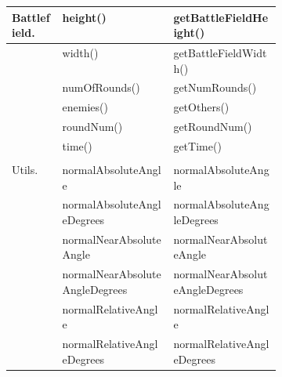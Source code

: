 \begin{center}
    \begin{tabular}{ | l| l | p{0.4\linewidth} | }
    \hline
    Battlefield. & height() & getBattleFieldHeight() \\ \hline
     & width() & getBattleFieldWidth() \\ \hline
     & numOfRounds() & getNumRounds() \\ \hline
     & enemies() & getOthers() \\ \hline
     & roundNum() & getRoundNum() \\ \hline
     & time() & getTime()  \\ \hline
   	 & &  \\ \hline    
     Utils. & normalAbsoluteAngle & normalAbsoluteAngle \\ \hline
     & normalAbsoluteAngleDegrees & normalAbsoluteAngleDegrees \\ \hline
     & normalNearAbsoluteAngle & normalNearAbsoluteAngle \\ \hline
     & normalNearAbsoluteAngleDegrees & normalNearAbsoluteAngleDegrees \\ \hline
     & normalRelativeAngle & normalRelativeAngle \\ \hline
     & normalRelativeAngleDegrees & normalRelativeAngleDegrees \\ \hline
    \end{tabular}
\end{center}

